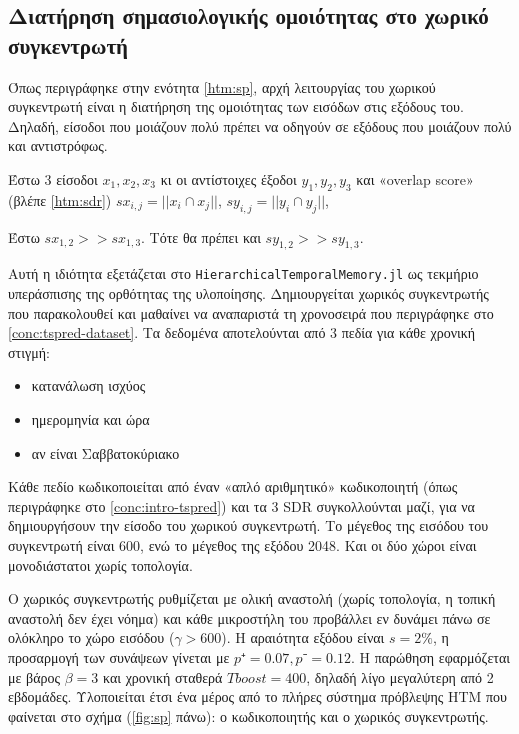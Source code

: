 \subsection{Διατήρηση σημασιολογικής ομοιότητας στο χωρικό συγκεντρωτή}

	Όπως περιγράφηκε στην ενότητα \ref{htm:sp}, αρχή λειτουργίας του χωρικού συγκεντρωτή είναι η διατήρηση της ομοιότητας των εισόδων στις εξόδους του.
	Δηλαδή, είσοδοι που μοιάζουν πολύ πρέπει να οδηγούν σε εξόδους που μοιάζουν πολύ και αντιστρόφως.

	Έστω 3 είσοδοι $x_1, x_2, x_3$ κι οι αντίστοιχες έξοδοι $y_1, y_2, y_3$
	και «overlap score» (βλέπε \ref{htm:sdr}) $\mathit{sx}_{i,j}= ||x_i ∩ x_j||$, $\mathit{sy}_{i,j}= ||y_i ∩ y_j||$,

	Έστω $\mathit{sx}_{1,2} >> \mathit{sx}_{1,3}$.
	Τότε θα πρέπει και $\mathit{sy}_{1,2} >> \mathit{sy}_{1,3}$.

	Αυτή η ιδιότητα εξετάζεται στο \texttt{HierarchicalTemporalMemory.jl} ως τεκμήριο υπεράσπισης της ορθότητας της υλοποίησης.
	Δημιουργείται χωρικός συγκεντρωτής που παρακολουθεί και μαθαίνει να αναπαριστά τη χρονοσειρά που περιγράφηκε στο \ref{conc:tspred-dataset}.
	Τα δεδομένα αποτελούνται από 3 πεδία για κάθε χρονική στιγμή:
	\begin{itemize}
		\item κατανάλωση ισχύος
		\item ημερομηνία και ώρα
		\item αν είναι Σαββατοκύριακο
	\end{itemize}

	Κάθε πεδίο κωδικοποιείται από έναν «απλό αριθμητικό» κωδικοποιητή (όπως περιγράφηκε στο \ref{conc:intro-tspred}) και τα 3 SDR συγκολλούνται μαζί,
	για να δημιουργήσουν την είσοδο του χωρικού συγκεντρωτή.
	Το μέγεθος της εισόδου του συγκεντρωτή είναι 600, ενώ το μέγεθος της εξόδου 2048.
	Και οι δύο χώροι είναι μονοδιάστατοι χωρίς τοπολογία.

	Ο χωρικός συγκεντρωτής ρυθμίζεται με ολική αναστολή (χωρίς τοπολογία, η τοπική αναστολή δεν έχει νόημα)
	και κάθε μικροστήλη του προβάλλει εν δυνάμει πάνω σε ολόκληρο το χώρο εισόδου ($γ>600$).
	Η αραιότητα εξόδου είναι $s=2\%$, η προσαρμογή των συνάψεων γίνεται με $p⁺= 0.07,p⁻= 0.12$.
	Η παρώθηση εφαρμόζεται με βάρος $β=3$ και χρονική σταθερά $Tboost=400$, δηλαδή λίγο μεγαλύτερη από 2 εβδομάδες.
	Υλοποιείται έτσι ένα μέρος από το πλήρες σύστημα πρόβλεψης HTM που φαίνεται στο σχήμα (\ref{fig:sp} πάνω): ο κωδικοποιητής και ο χωρικός συγκεντρωτής.

